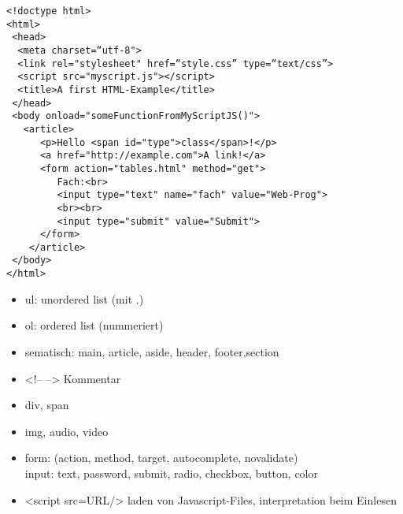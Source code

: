\begin{verbatim}
<!doctype html>
<html>
 <head>
  <meta charset=“utf-8">
  <link rel="stylesheet" href=“style.css” type=“text/css”>
  <script src="myscript.js"></script>
  <title>A first HTML-Example</title>
 </head>
 <body onload="someFunctionFromMyScriptJS()">
   <article>
      <p>Hello <span id="type">class</span>!</p>
      <a href="http://example.com">A link!</a>
      <form action="tables.html" method="get">
         Fach:<br>
         <input type="text" name="fach" value="Web-Prog">
         <br><br>
         <input type="submit" value="Submit">
      </form>
    </article>
 </body>
</html>
\end{verbatim}

\begin{itemize}
\item ul: unordered list (mit .)
\item ol: ordered list (nummeriert)
\item sematisch: main, article, aside, header, footer,section
\item <!-- --> Kommentar
\item div, span
\item img, audio, video
\item form: (action, method, target, autocomplete, novalidate)\\
   input: text, password, submit, radio, checkbox, button, color
  \item <script src=URL/> laden von Javascript-Files, interpretation beim Einlesen
\end{itemize}



